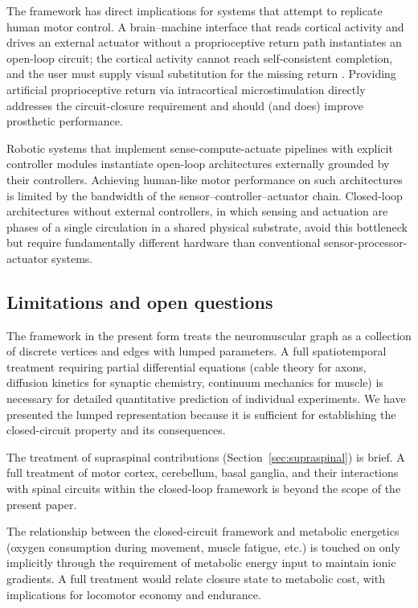 \documentclass[11pt,twocolumn,a4paper]{article}
\theoremstyle{definition}
\theoremstyle{remark}
\begin{document}
The framework has direct implications for systems that attempt to
replicate human motor control. A brain--machine interface that reads
cortical activity and drives an external actuator without a
proprioceptive return path instantiates an open-loop circuit; the
cortical activity cannot reach self-consistent completion, and the
user must supply visual substitution for the missing return
\citep{hochberg2006,ajiboye2017}. Providing artificial proprioceptive
return via intracortical microstimulation \citep{flesher2016,%
flesher2021} directly addresses the circuit-closure requirement and
should (and does) improve prosthetic performance.

Robotic systems that implement sense-compute-actuate pipelines with
explicit controller modules instantiate open-loop architectures
externally grounded by their controllers. Achieving human-like motor
performance on such architectures is limited by the bandwidth of the
sensor--controller--actuator chain. Closed-loop architectures without
external controllers, in which sensing and actuation are phases of a
single circulation in a shared physical substrate, avoid this
bottleneck but require fundamentally different hardware than
conventional sensor-processor-actuator systems.

\subsection{Limitations and open questions}

The framework in the present form treats the neuromuscular graph as a
collection of discrete vertices and edges with lumped parameters. A
full spatiotemporal treatment requiring partial differential equations
(cable theory for axons, diffusion kinetics for synaptic chemistry,
continuum mechanics for muscle) is necessary for detailed quantitative
prediction of individual experiments. We have presented the lumped
representation because it is sufficient for establishing the
closed-circuit property and its consequences.

The treatment of supraspinal contributions (Section~\ref{sec:supraspinal})
is brief. A full treatment of motor cortex, cerebellum, basal ganglia,
and their interactions with spinal circuits within the closed-loop
framework is beyond the scope of the present paper.

The relationship between the closed-circuit framework and
metabolic energetics (oxygen consumption during movement, muscle
fatigue, etc.) is touched on only implicitly through the requirement
of metabolic energy input to maintain ionic gradients. A full treatment
would relate closure state to metabolic cost, with implications for
locomotor economy and endurance.
\end{document}
